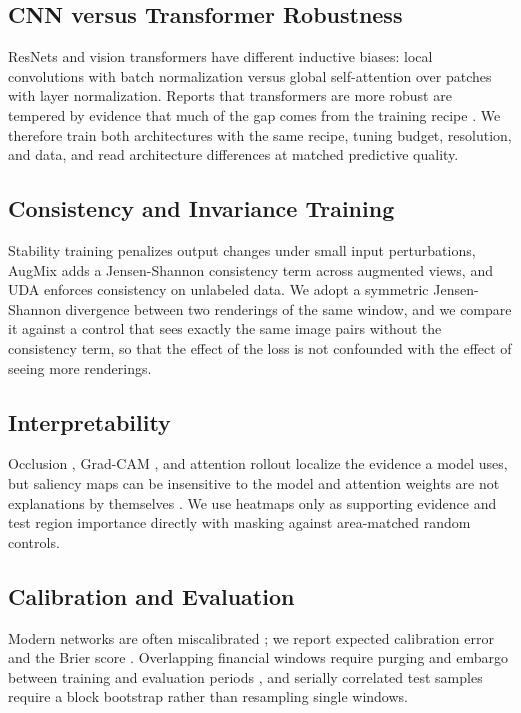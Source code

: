 \documentclass[10pt,journal,compsoc]{IEEEtran}
\begin{document}
\subsection{CNN versus Transformer Robustness}
ResNets \cite{he2016resnet} and vision transformers \cite{dosovitskiy2021vit, touvron2021deit} have different inductive biases: local convolutions with batch normalization versus global self-attention over patches with layer normalization. Reports that transformers are more robust \cite{naseer2021intriguing} are tempered by evidence that much of the gap comes from the training recipe \cite{bai2021transformers, wightman2021resnet}. We therefore train both architectures with the same recipe, tuning budget, resolution, and data, and read architecture differences at matched predictive quality.

\subsection{Consistency and Invariance Training}
Stability training \cite{zheng2016stability} penalizes output changes under small input perturbations, AugMix \cite{hendrycks2020augmix} adds a Jensen-Shannon consistency term across augmented views, and UDA \cite{xie2020uda} enforces consistency on unlabeled data. We adopt a symmetric Jensen-Shannon divergence \cite{lin1991divergence} between two renderings of the same window, and we compare it against a control that sees exactly the same image pairs without the consistency term, so that the effect of the loss is not confounded with the effect of seeing more renderings.

\subsection{Interpretability}
Occlusion \cite{zeiler2014visualizing}, Grad-CAM \cite{selvaraju2017gradcam}, and attention rollout \cite{abnar2020rollout} localize the evidence a model uses, but saliency maps can be insensitive to the model \cite{adebayo2018sanity} and attention weights are not explanations by themselves \cite{jain2019attention}. We use heatmaps only as supporting evidence and test region importance directly with masking against area-matched random controls.

\subsection{Calibration and Evaluation}
Modern networks are often miscalibrated \cite{guo2017calibration}; we report expected calibration error \cite{naeini2015ece} and the Brier score \cite{brier1950verification}. Overlapping financial windows require purging and embargo between training and evaluation periods \cite{lopezdeprado2018advances}, and serially correlated test samples require a block bootstrap \cite{kunsch1989jackknife} rather than resampling single windows.
\end{document}
